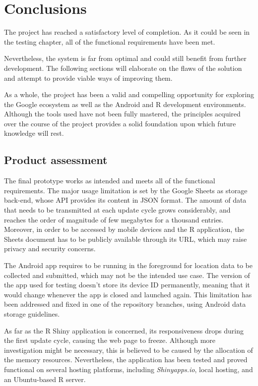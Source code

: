 \chapter{Conclusions}
The project has reached a satisfactory level of completion.
As it could be seen in the testing chapter, all of the functional requirements have been met.

Nevertheless, the system is far from optimal and could still benefit from further development.
The following sections will elaborate on the flaws of the solution and attempt to provide viable ways of improving them.

As a whole, the project has been a valid and compelling opportunity for exploring the Google ecosystem as well as the Android and R development environments.
Although the tools used have not been fully mastered, the principles acquired over the course of the project provides a solid foundation upon which future knowledge will rest.


\section{Product assessment}
The final prototype works as intended and meets all of the functional requirements.
The major usage limitation is set by the Google Sheets as storage back-end, whose API provides its content in JSON format.
The amount of data that needs to be transmitted at each update cycle grows considerably, and reaches the order of magnitude of few megabytes for a thousand entries.
Moreover, in order to be accessed by mobile devices and the R application, the Sheets document has to be publicly available through its URL, which may raise privacy and security concerns.

The Android app requires to be running in the foreground for location data to be collected and submitted, which may not be the intended use case.
The version of the app used for testing doesn't store its device ID permanently, meaning that it would change whenever the app is closed and launched again.
This limitation has been addressed and fixed in one of the repository branches, using Android data storage guidelines.

As far as the R Shiny application is concerned, its responsiveness drops during the first update cycle, causing the web page to freeze.
Although more investigation might be necessary, this is believed to be caused by the allocation of the memory resources.
Nevertheless, the application has been tested and proved functional on several hosting platforms, including \emph{Shinyapps.io}, local hosting, and an Ubuntu-based R server.


